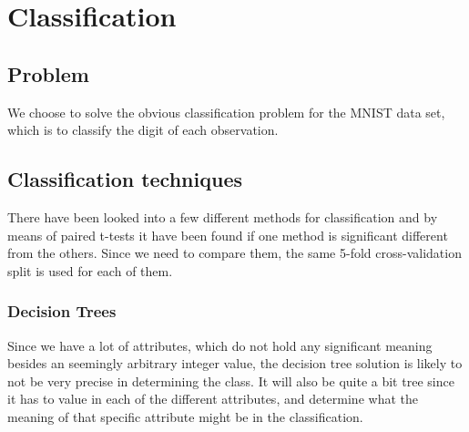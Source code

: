 \chapter{Classification}

\section{Problem}
We choose to solve the obvious classification problem for the MNIST data set, which is to classify the digit of each observation. 

\section{Classification techniques}
There have been looked into a few different methods for classification and by means of paired t-tests it have been found if one method is significant different from the others. Since we need to compare them, the same 5-fold cross-validation split is used for each of them.

\subsection{Decision Trees}
Since we have a lot of attributes, which do not hold any significant meaning besides an seemingly arbitrary integer value, the decision tree solution is likely to not be very precise in determining the class. It will also be quite a bit tree since it has to value in each  of the different attributes, and determine what the meaning of that specific attribute might be in the classification.

